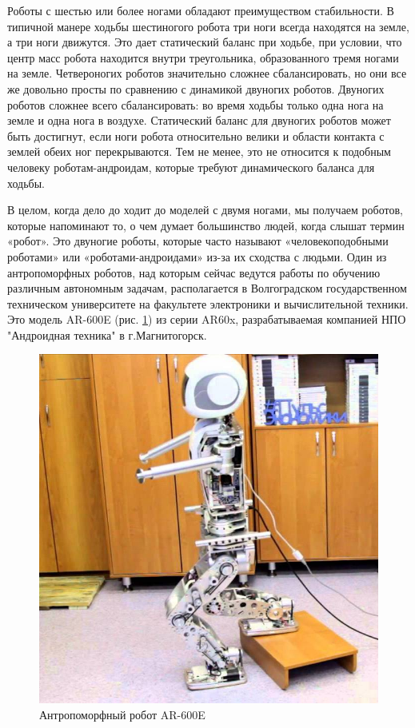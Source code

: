 Роботы с шестью или более ногами обладают преимуществом стабильности. В типичной манере ходьбы шестиногого робота три ноги всегда находятся на земле, а три ноги движутся. Это дает статический баланс при ходьбе, при условии, что центр масс робота находится внутри треугольника, образованного тремя ногами на земле. Четвероногих роботов значительно сложнее сбалансировать, но они все же довольно просты по сравнению с динамикой двуногих роботов. Двуногих роботов сложнее всего сбалансировать: во время ходьбы только одна нога на земле и одна нога в воздухе. Статический баланс для двуногих роботов может быть достигнут, если ноги робота относительно велики и области контакта с землей обеих ног перекрываются. Тем не менее, это не относится к подобным человеку роботам-андроидам, которые требуют динамического баланса для ходьбы.

В целом, когда дело до ходит до моделей с двумя ногами, мы получаем роботов, которые напоминают то, о чем думает большинство людей, когда слышат термин «робот». Это двуногие роботы, которые часто называют «человекоподобными роботами» или «роботами-андроидами» из-за их сходства с людьми. Один из антропоморфных роботов, над которым сейчас ведутся работы по обучению различным автономным задачам, располагается в Волгоградском государственном техническом университете на факультете электроники и вычислительной техники. Это модель AR-600E (рис. \ref{img:ar600}) из серии AR60x, разрабатываемая компанией НПО "Андроидная техника"{} в г.Магнитогорск.

\begin{figure}
	\centering
	\includegraphics[]{img/ar-600}
	\caption{Антропоморфный робот AR-600E}
	\label{img:ar600}
\end{figure}

